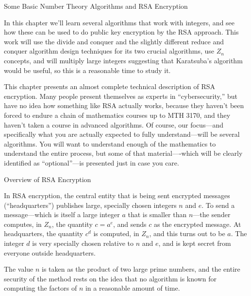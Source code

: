 





{\bigboldfont  Some Basic Number Theory Algorithms and RSA Encryption}
\medskip

In this chapter we'll learn several algorithms that work with integers, and see how these
can be used to do public key encryption by the RSA approach.
This work will use the divide and conquer and the slightly different reduce and conquer
algorithm design techniques for
 its two crucial algorithms, use $Z_n$ concepts, and will multiply large integers
 suggesting that Karatsuba's algorithm would be useful,
so this is a reasonable
time to study it.
\medskip

    This chapter presents an almost complete technical description of RSA encryption.
    Many people present themselves as experts in ``cybersecurity,'' but have no idea how
    something like RSA actually works, because they haven't been forced to endure a chain
    of mathematics courses up to MTH 3170, and they haven't taken a course in advanced
    algorithms.  Of course, our focus---and specifically what you are actually expected to
    fully understand---will be several algorithms.   You will want to understand enough of the
    mathematics to understand the entire process, but some of that material----which will
    be clearly identified as ``optional''---is presented just in case you care.
\border
\Outdent

{\bigboldfont Overview of RSA Encryption}
\medskip

In RSA encryption, the central entity that is being sent encrypted 
messages (``headquarters'') publishes
large, specially chosen integers $n$ and $e$.  To send a message---which is itself a
large integer $a$ that is smaller than $n$---the sender computes, in $Z_n$,
the quantity $c = a^e$, and
sends $c$ as the encrypted message.  At headquarters, the quantity $c^d$ is computed,
in $Z_n$,
and this turns out to be $a$.  The integer $d$ is very specially chosen relative to $n$ and $e$,
and is kept secret from everyone outside headquarters.
\medskip

The value $n$ is taken as the product of two large prime numbers, and the entire security
of the method rests on the idea that no algorithm is known for computing the factors
of $n$ in a reasonable amount of time.
\medskip

